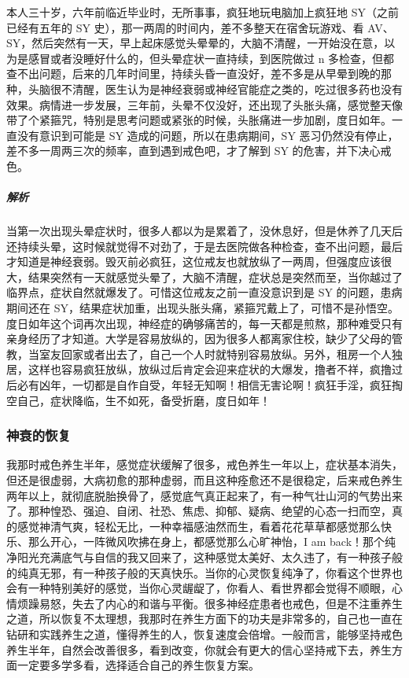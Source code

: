 \begin{case}[神经衰弱]
    本人三十岁，六年前临近毕业时，无所事事，疯狂地玩电脑加上疯狂地 SY（之前已经有五年的 SY 史），那一两周的时间内，差不多整天在宿舍玩游戏、看 AV、SY，然后突然有一天，早上起床感觉头晕晕的，大脑不清醒，一开始没在意，以为是感冒或者没睡好什么的，但头晕症状一直持续，到医院做过 n 多检查，但都查不出问题，后来的几年时间里，持续头昏一直没好，差不多是从早晕到晚的那种，头脑很不清醒，医生认为是神经衰弱或神经官能症之类的，吃过很多药也没有效果。病情进一步发展，三年前，头晕不仅没好，还出现了头胀头痛，感觉整天像带了个紧箍咒，特别是思考问题或紧张的时候，头胀痛进一步加剧，度日如年。一直没有意识到可能是 SY 造成的问题，所以在患病期间，SY 恶习仍然没有停止，差不多一周两三次的频率，直到遇到戒色吧，才了解到 SY 的危害，并下决心戒色。
    \subparagraph{解析} 当第一次出现头晕症状时，很多人都以为是累着了，没休息好，但是休养了几天后还持续头晕，这时候就觉得不对劲了，于是去医院做各种检查，查不出问题，最后才知道是神经衰弱。毁灭前必疯狂，这位戒友也就放纵了一两周，但强度应该很大，结果突然有一天就感觉头晕了，大脑不清醒，症状总是突然而至，当你越过了临界点，症状自然就爆发了。可惜这位戒友之前一直没意识到是 SY 的问题，患病期间还在 SY，结果症状加重，出现头胀头痛，紧箍咒戴上了，可惜不是孙悟空。度日如年这个词再次出现，神经症的确够痛苦的，每一天都是煎熬，那种难受只有亲身经历了才知道。大学是容易放纵的，因为很多人都离家住校，缺少了父母的管教，当室友回家或者出去了，自己一个人时就特别容易放纵。另外，租房一个人独居，这样也容易疯狂放纵，放纵过后肯定会迎来症状的大爆发，撸者不祥，疯撸过后必有凶年，一切都是自作自受，年轻无知啊！相信无害论啊！疯狂手淫，疯狂掏空自己，症状降临，生不如死，备受折磨，度日如年！
\end{case}

\subsubsection{神衰的恢复}

我那时戒色养生半年，感觉症状缓解了很多，戒色养生一年以上，症状基本消失，但还是很虚弱，大病初愈的那种虚弱，而且这种痊愈还不是很稳定，后来戒色养生两年以上，就彻底脱胎换骨了，感觉底气真正起来了，有一种气壮山河的气势出来了。那种惶恐、强迫、自闭、社恐、焦虑、抑郁、疑病、绝望的心态一扫而空，真的感觉神清气爽，轻松无比，一种幸福感油然而生，看着花花草草都感觉那么快乐、那么开心，一阵微风吹拂在身上，都感觉那么心旷神怡，I am back！那个纯净阳光充满底气与自信的我又回来了，这种感觉太美好、太久违了，有一种孩子般的纯真无邪，有一种孩子般的天真快乐。当你的心灵恢复纯净了，你看这个世界也会有一种特别美好的感觉，当你心灵龌龊了，你看人、看世界都会觉得不顺眼，心情烦躁易怒，失去了内心的和谐与平衡。很多神经症患者也戒色，但是不注重养生之道，所以恢复不太理想，我那时在养生方面下的功夫是非常多的，自己也一直在钻研和实践养生之道，懂得养生的人，恢复速度会倍增。一般而言，能够坚持戒色养生半年，自然会改善很多，看到改变，你就会有更大的信心坚持戒下去，养生方面一定要多学多看，选择适合自己的养生恢复方案。

